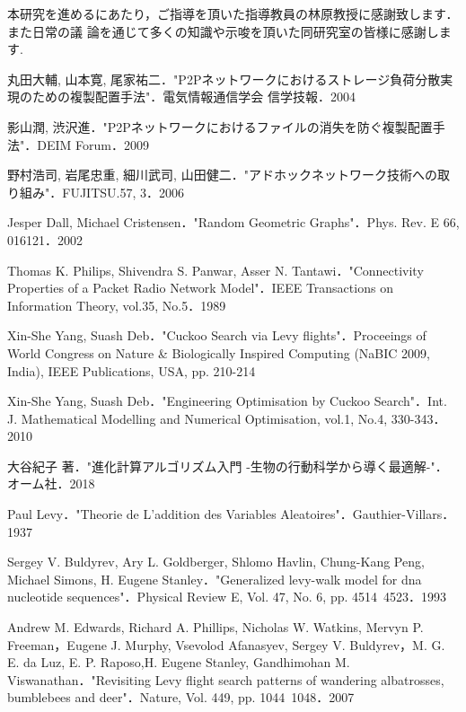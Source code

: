 \documentclass[11pt]{jreport}
\begin{document}
 \begin{acknowledgements}
 本研究を進めるにあたり，ご指導を頂いた指導教員の林原教授に感謝致します．また日常の議 論を通じて多くの知識や示唆を頂いた同研究室の皆様に感謝します.
 \end{acknowledgements}


\begin{thebibliography}{99}

丸田大輔, 山本寛, 尾家祐二．"P2Pネットワークにおけるストレージ負荷分散実現のための複製配置手法"．電気情報通信学会 信学技報．2004

影山潤, 渋沢進．"P2Pネットワークにおけるファイルの消失を防ぐ複製配置手法"．DEIM Forum．2009

野村浩司, 岩尾忠重, 細川武司, 山田健二．"アドホックネットワーク技術への取り組み"．FUJITSU.57, 3．2006

Jesper Dall, Michael Cristensen．"Random Geometric Graphs"．Phys. Rev. E 66, 016121．2002

Thomas K. Philips, Shivendra S. Panwar, Asser N. Tantawi．"Connectivity Properties of a Packet Radio Network Model"．IEEE Transactions on Information Theory, vol.35, No.5．1989

Xin-She Yang, Suash Deb．"Cuckoo Search via Levy flights"．Proceeings of World Congress on Nature \& Biologically Inspired Computing (NaBIC 2009, India), IEEE Publications, USA, pp. 210-214

Xin-She Yang, Suash Deb．"Engineering Optimisation by Cuckoo Search"．Int. J. Mathematical Modelling and Numerical Optimisation, vol.1,  No.4, 330-343．2010

大谷紀子 著．"進化計算アルゴリズム入門 -生物の行動科学から導く最適解-"．オーム社．2018

Paul Levy．"Theorie de L’addition des Variables Aleatoires"．Gauthier-Villars．1937

Sergey V. Buldyrev, Ary L. Goldberger, Shlomo Havlin, Chung-Kang Peng, Michael Simons, H. Eugene Stanley．"Generalized levy-walk model for dna nucleotide sequences"．Physical Review E, Vol. 47, No. 6, pp. 4514~4523．1993

Andrew M. Edwards, Richard A. Phillips, Nicholas W. Watkins, Mervyn P. Freeman，Eugene J. Murphy, Vsevolod Afanasyev, Sergey V. Buldyrev，M. G. E. da Luz, E. P. Raposo,H. Eugene Stanley, Gandhimohan M. Viswanathan．"Revisiting Levy flight search patterns of wandering albatrosses, bumblebees and deer"．Nature, Vol. 449, pp. 1044~1048．2007


\end{thebibliography}
\end{document}
